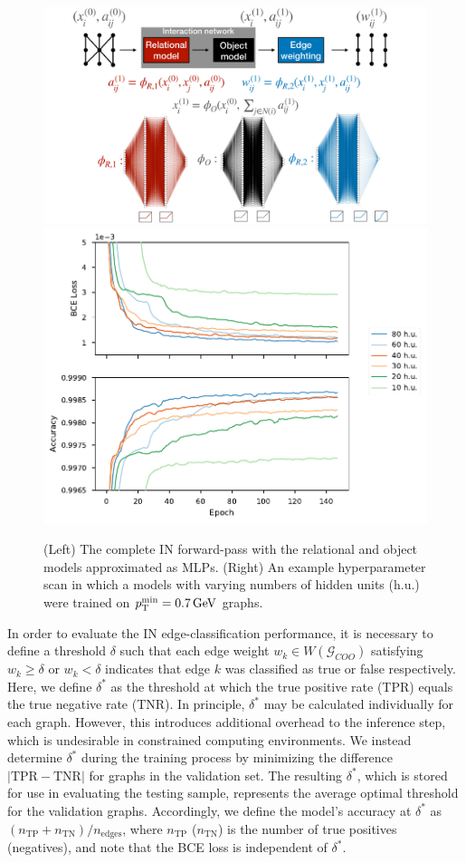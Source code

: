 \documentclass[twocolumn]{svjour3}
\newcommand{\pt}{\ensuremath{p_{\mathrm{T}}}\xspace}
\newcommand{\GeV}{\ensuremath{\,\text{Ge\hspace{-.08em}V}}\xspace}
\newcommand{\nedges}{\ensuremath{n_\mathrm{edges}\xspace}}
\begin{document}
\begin{figure}[!htbp]
\centering
  \includegraphics[width=.5\linewidth]{network_diagram.pdf}
  \includegraphics[width=.4\linewidth]{hyperparam_scans_0p7.pdf}
\captionsetup{labelfont=bf}
\caption{(Left) The complete IN forward-pass with the relational and object models approximated as MLPs.
(Right) An example hyperparameter scan in which a models with varying numbers of hidden units (h.u.) were trained on $\pt^\mathrm{min}=0.7\GeV$ graphs.}
\label{fig:forward-pass}
\end{figure}


In order to evaluate the IN edge-classification performance, it is necessary to define a threshold $\delta$ such that each edge weight $w_k\in W(\mathcal{G}_{COO})$ satisfying $w_k\geq\delta$ or $w_k<\delta$ indicates that edge $k$ was classified as true or false respectively. 
Here, we define $\delta^*$ as the threshold at which the true positive rate (TPR) equals the true negative rate (TNR). 
In principle, $\delta^*$ may be calculated individually for each graph. 
However, this introduces additional overhead to the inference step, which is undesirable in constrained computing environments. 
We instead determine $\delta^*$ during the training process by minimizing the difference $|\mathrm{TPR}-\mathrm{TNR}|$ for graphs in the validation set. 
The resulting $\delta^*$, which is stored for use in evaluating the testing sample, represents the average optimal threshold for the validation graphs. 
Accordingly, we define the model's accuracy at $\delta^*$ as $(n_\mathrm{TP}+n_\mathrm{TN})/\nedges$, where $n_\mathrm{TP}$  ($n_\mathrm{TN}$) is the number of true positives (negatives), and note that the BCE loss is independent of $\delta^*$. 
\end{document}
